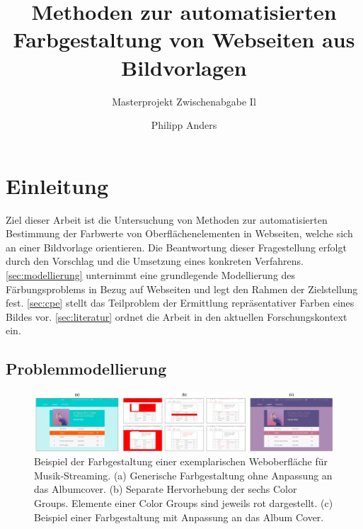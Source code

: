 \documentclass[11pt, bibliography=totoc]{scrartcl}
\begin{document}
\title{Methoden zur automatisierten Farbgestaltung von Webseiten aus Bildvorlagen}
\subtitle{Masterprojekt Zwischenabgabe Il}
\author{Philipp Anders}

\maketitle

\begin{abstract}
\end{abstract}

\pagebreak
\tableofcontents
\pagebreak

\section{Einleitung}

Ziel dieser Arbeit ist die Untersuchung von Methoden zur automatisierten Bestimmung der Farbwerte von Oberflächenelementen in Webseiten, welche sich an einer Bildvorlage orientieren. Die Beantwortung dieser Fragestellung erfolgt durch den Vorschlag und die Umsetzung eines konkreten Verfahrens. \autoref{sec:modellierung} unternimmt eine grundlegende Modellierung des Färbungsproblems in Bezug auf Webseiten und legt  den Rahmen der Zielstellung fest. \autoref{sec:cpe} stellt das Teilproblem der Ermittlung repräsentativer Farben eines Bildes vor. \autoref{sec:literatur} ordnet die Arbeit in den aktuellen Forschungskontext ein.

\subsection{Problemmodellierung}
\label{sec:modellierung}

\begin{figure}[h]
	\centering
	\includegraphics[width=1\textwidth]{img/color_groups.png}
	\caption{Beispiel der Farbgestaltung einer exemplarischen Weboberfläche für Musik-Streaming. (a) Generische Farbgestaltung ohne Anpassung an das Albumcover. (b) Separate Hervorhebung der sechs Color Groups. Elemente einer Color Groups sind jeweils rot dargestellt. (c) Beispiel einer Farbgestaltung mit Anpassung an das Album Cover.}
	\label{fig:colorgroups}
\end{figure}
\end{document}

